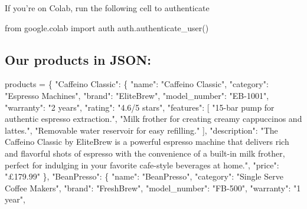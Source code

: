 \documentclass[
  letterpaper,
  DIV=11,
  numbers=noendperiod]{scrreprt}
\newenvironment{Shaded}{\begin{snugshade}}{\end{snugshade}}
\newcommand{\ImportTok}[1]{\textcolor[rgb]{0.00,0.46,0.62}{#1}}
\newcommand{\NormalTok}[1]{\textcolor[rgb]{0.00,0.23,0.31}{#1}}
\newcommand{\OperatorTok}[1]{\textcolor[rgb]{0.37,0.37,0.37}{#1}}
\newcommand{\StringTok}[1]{\textcolor[rgb]{0.13,0.47,0.30}{#1}}
\begin{document}
If you're on Colab, run the following cell to authenticate

\begin{Shaded}
\begin{Highlighting}[]
\ImportTok{from}\NormalTok{ google.colab }\ImportTok{import}\NormalTok{ auth}
\NormalTok{auth.authenticate\_user()}
\end{Highlighting}
\end{Shaded}

\hypertarget{our-products-in-json}{%
\subsection{Our products in JSON:}\label{our-products-in-json}}

\begin{Shaded}
\begin{Highlighting}[]
\NormalTok{products }\OperatorTok{=}\NormalTok{ \{}
    \StringTok{"Caffeino Classic"}\NormalTok{: \{}
      \StringTok{"name"}\NormalTok{: }\StringTok{"Caffeino Classic"}\NormalTok{,}
      \StringTok{"category"}\NormalTok{: }\StringTok{"Espresso Machines"}\NormalTok{,}
      \StringTok{"brand"}\NormalTok{: }\StringTok{"EliteBrew"}\NormalTok{,}
      \StringTok{"model\_number"}\NormalTok{: }\StringTok{"EB{-}1001"}\NormalTok{,}
      \StringTok{"warranty"}\NormalTok{: }\StringTok{"2 years"}\NormalTok{,}
      \StringTok{"rating"}\NormalTok{: }\StringTok{"4.6/5 stars"}\NormalTok{,}
      \StringTok{"features"}\NormalTok{: [}
        \StringTok{"15{-}bar pump for authentic espresso extraction."}\NormalTok{,}
        \StringTok{"Milk frother for creating creamy cappuccinos and lattes."}\NormalTok{,}
        \StringTok{"Removable water reservoir for easy refilling."}
\NormalTok{      ],}
      \StringTok{"description"}\NormalTok{: }\StringTok{"The Caffeino Classic by EliteBrew is a powerful espresso machine that delivers rich and flavorful shots of espresso with the convenience of a built{-}in milk frother, perfect for indulging in your favorite cafe{-}style beverages at home."}\NormalTok{,}
      \StringTok{"price"}\NormalTok{: }\StringTok{"£179.99"}
\NormalTok{    \},}
    \StringTok{"BeanPresso"}\NormalTok{: \{}
      \StringTok{"name"}\NormalTok{: }\StringTok{"BeanPresso"}\NormalTok{,}
      \StringTok{"category"}\NormalTok{: }\StringTok{"Single Serve Coffee Makers"}\NormalTok{,}
      \StringTok{"brand"}\NormalTok{: }\StringTok{"FreshBrew"}\NormalTok{,}
      \StringTok{"model\_number"}\NormalTok{: }\StringTok{"FB{-}500"}\NormalTok{,}
      \StringTok{"warranty"}\NormalTok{: }\StringTok{"1 year"}\NormalTok{,}

\end{Highlighting}
\end{Shaded}
\end{document}
